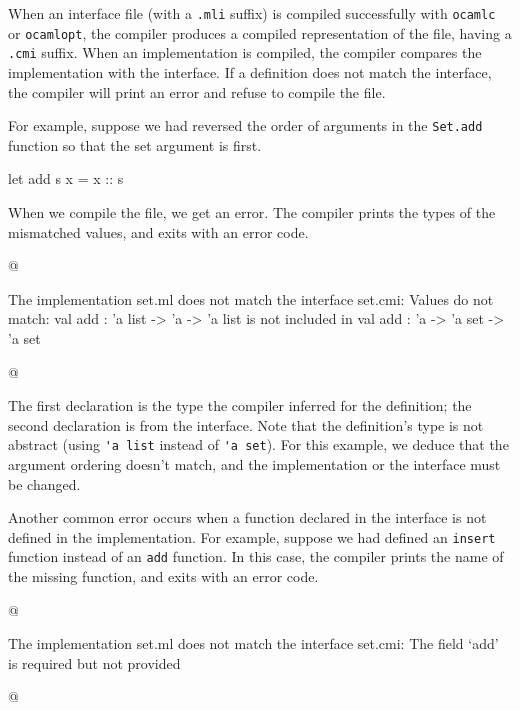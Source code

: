 
When an interface file (with a \hbox{\lstinline/.mli/} suffix) is
compiled successfully with \hbox{\lstinline/ocamlc/}
or \hbox{\lstinline/ocamlopt/}, the compiler produces a compiled
representation of the file, having a \hbox{\lstinline/.cmi/} suffix.
When an implementation is compiled, the compiler compares the
implementation with the interface.  If a definition does not match the
interface, the compiler will print an error and refuse to compile the
file.


For example, suppose we had reversed the order of arguments in the
\hbox{\lstinline/Set.add/} function so that the set argument is first.

\begin{ocaml}
let add s x = x :: s
\end{ocaml}
%
When we compile the file, we get an error. The compiler prints the
types of the mismatched values, and exits with an error code.

\begin{ocaml}
@
\begin{toperror}
The implementation set.ml does not match the interface set.cmi:
Values do not match:
  val add : 'a list -> 'a -> 'a list
is not included in
  val add : 'a -> 'a set -> 'a set
\end{toperror}
@
\end{ocaml}
%
The first declaration is the type the compiler inferred for the
definition; the second declaration is from the interface. Note that
the definition's type is not abstract (using
\hbox{\lstinline/'a list/}
instead of \hbox{\lstinline/'a set/}). For this example, we deduce
that the argument ordering doesn't match, and the implementation or the
interface must be changed.


Another common error occurs when a function declared in the interface
is not defined in the implementation. For example, suppose we had
defined an \texttt{insert} function instead of an \texttt{add}
function. In this case, the compiler prints the name of the missing
function, and exits with an error code.

\begin{ocaml}
@
\begin{toperror}
The implementation set.ml does not match the interface set.cmi:
The field `add' is required but not provided
\end{toperror}
@
\end{ocaml}

